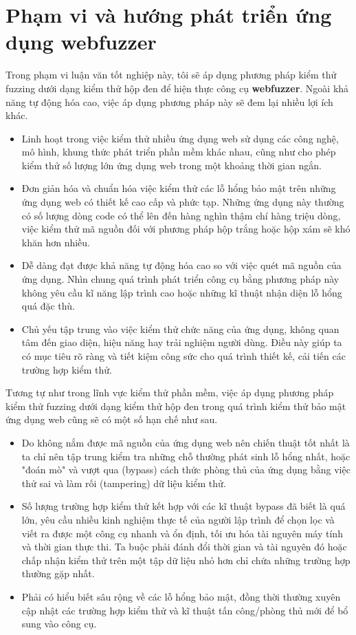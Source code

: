 \chapter{Phạm vi và hướng phát triển ứng dụng webfuzzer}
Trong phạm vi luận văn tốt nghiệp này, tôi sẽ áp dụng phương pháp kiểm thử fuzzing dưới dạng kiểm thử hộp đen để hiện thực công cụ \textbf{webfuzzer}. Ngoài khả năng tự động hóa cao, việc áp dụng phương pháp này sẽ đem lại nhiều lợi ích khác.
\begin{itemize}
    \item Linh hoạt trong việc kiểm thử nhiều ứng dụng web sử dụng các công nghệ, mô hình, khung thức phát triển phần mềm khác nhau, cũng như cho phép kiểm thử số lượng lớn ứng dụng web trong một khoảng thời gian ngắn.
    \item Đơn giản hóa và chuẩn hóa việc kiểm thử các lỗ hổng bảo mật trên những ứng dụng web có thiết kế cao cấp và phức tạp. Những ứng dụng này thường có số lượng dòng code có thể lên đến hàng nghìn thậm chí hàng triệu dòng, việc kiểm thử mã nguồn đối với phương pháp hộp trắng hoặc hộp xám sẽ khó khăn hơn nhiều.
    \item Dễ dàng đạt được khả năng tự động hóa cao so với việc quét mã nguồn của ứng dụng. Nhìn chung quá trình phát triển công cụ bằng phương pháp này không yêu cầu kĩ năng lập trình cao hoặc những kĩ thuật nhận diện lỗ hổng quá đặc thù.
    \item Chủ yếu tập trung vào việc kiểm thử chức năng của ứng dụng, không quan tâm đến giao diện, hiệu năng hay trải nghiệm người dùng. Điều này giúp ta có mục tiêu rõ ràng và tiết kiệm công sức cho quá trình thiết kế, cải tiến các trường hợp kiểm thử. 
\end{itemize}
Tương tự như trong lĩnh vực kiểm thử phần mềm, việc áp dụng phương pháp kiểm thử fuzzing dưới dạng kiểm thử hộp đen trong quá trình kiểm thử bảo mật ứng dụng web cũng sẽ có một số hạn chế như sau.
\begin{itemize}
    \item Do không nắm được mã nguồn của ứng dụng web nên chiến thuật tốt nhất là ta chỉ nên tập trung kiểm tra những chỗ thường phát sinh lỗ hổng nhất, hoặc "đoán mò" và vượt qua (bypass) cách thức phòng thủ của ứng dụng bằng việc thử sai và làm rối (tampering) dữ liệu kiểm thử.
    \item Số lượng trường hợp kiểm thử kết hợp với các kĩ thuật bypass đã biết là quá lớn, yêu cầu nhiều kinh nghiệm thực tế của người lập trình để chọn lọc và viết ra được một công cụ nhanh và ổn định, tối ưu hóa tài nguyên máy tính và thời gian thực thi. Ta buộc phải đánh đổi thời gian và tài nguyên đó hoặc chấp nhận kiểm thử trên một tập dữ liệu nhỏ hơn chỉ chứa những trường hợp thường gặp nhất.
    \item Phải có hiểu biết sâu rộng về các lỗ hổng bảo mật, đồng thời thường xuyên cập nhật các trường hợp kiểm thử và kĩ thuật tấn công/phòng thủ mới để bổ sung vào công cụ.
\end{itemize}
